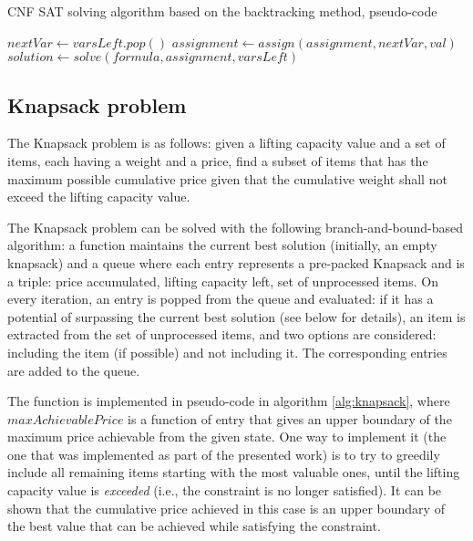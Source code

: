 \begin{algorithm}
\caption{CNF SAT solving algorithm based on the backtracking method, pseudo-code}
\label{alg:cnf_sat}
\begin{algorithmic}
        \State {}
    \EndIf

    \State

    \State $nextVar \gets varsLeft.pop()$
        \State $assignment \gets assign(assignment, nextVar, val)$
            \State $solution \gets solve(formula, assignment, varsLeft)$
                \State {}
            \EndIf
        \EndIf
    \EndFor

    \State

    \State \Return{$\varnothing$}
\EndProcedure
\end{algorithmic}
\end{algorithm}

\subsection{Knapsack problem}

The Knapsack problem is as follows: given a lifting capacity value and a set of items,
each having a weight and a price, find a subset of items that has the maximum possible
cumulative price given that the cumulative weight shall not exceed the lifting capacity value.

The Knapsack problem can be solved with the following branch-and-bound-based algorithm:
a function maintains the current best solution (initially, an empty knapsack) and a queue where
each entry represents a pre-packed Knapsack and is a triple:
price accumulated, lifting capacity left, set of unprocessed items. On every iteration,
an entry is popped from the queue and evaluated: if it has a potential of surpassing the
current best solution (see below for details), an item is extracted from the set of unprocessed
items, and two options are considered: including the item (if possible) and not including it.
The corresponding entries are added to the queue.

\sloppy
The function is implemented in pseudo-code in algorithm \ref{alg:knapsack},
where $maxAchievablePrice$ is a function of entry that gives an upper boundary of the maximum
price achievable from the given state. One way to implement it (the one that was implemented
as part of the presented work) is to try to greedily include all remaining items starting with
the most valuable ones, until the lifting capacity value is \emph{exceeded}
(i.e., the constraint is no longer satisfied). It can be shown that the cumulative price
achieved in this case is an upper boundary of the best value that can be achieved while
satisfying the constraint.

